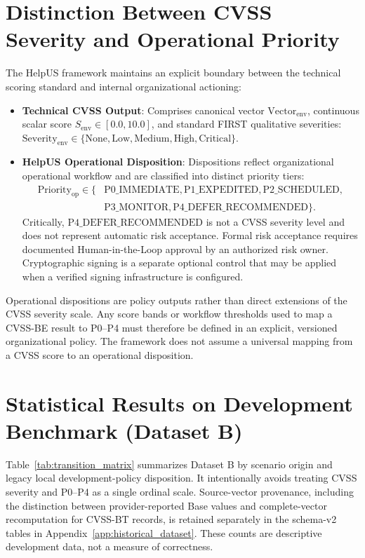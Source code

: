 \section{Distinction Between CVSS Severity and Operational Priority}
\label{sec:priority_taxonomy}
The HelpUS framework maintains an explicit boundary between the technical scoring standard and internal organizational actioning:
\begin{itemize}
    \item \textbf{Technical CVSS Output}: Comprises canonical vector $\text{Vector}_{\text{env}}$, continuous scalar score $S_{\text{env}} \in [0.0, 10.0]$, and standard FIRST qualitative severities: $\text{Severity}_{\text{env}} \in \{\text{None}, \text{Low}, \text{Medium}, \text{High}, \text{Critical}\}$.
    \item \textbf{HelpUS Operational Disposition}: Dispositions reflect organizational operational workflow and are classified into distinct priority tiers:
    \begin{align}
        \text{Priority}_{\text{op}} \in \{&\text{P0\_IMMEDIATE}, \text{P1\_EXPEDITED}, \text{P2\_SCHEDULED}, \\
        &\text{P3\_MONITOR}, \text{P4\_DEFER\_RECOMMENDED}\}.
    \end{align}
    Critically, $\text{P4\_DEFER\_RECOMMENDED}$ is not a CVSS severity level and does not represent automatic risk acceptance. Formal risk acceptance requires documented Human-in-the-Loop approval by an authorized risk owner. Cryptographic signing is a separate optional control that may be applied when a verified signing infrastructure is configured.
\end{itemize}

Operational dispositions are policy outputs rather than direct extensions of the CVSS severity scale. Any score bands or workflow thresholds used to map a CVSS-BE result to P0--P4 must therefore be defined in an explicit, versioned organizational policy. The framework does not assume a universal mapping from a CVSS score to an operational disposition.

\section{Statistical Results on Development Benchmark (Dataset B)}
Table~\ref{tab:transition_matrix} summarizes Dataset B by scenario origin and legacy local development-policy disposition. It intentionally avoids treating CVSS severity and P0--P4 as a single ordinal scale. Source-vector provenance, including the distinction between provider-reported Base values and complete-vector recomputation for CVSS-BT records, is retained separately in the schema-v2 tables in Appendix~\ref{app:historical_dataset}. These counts are descriptive development data, not a measure of correctness.


